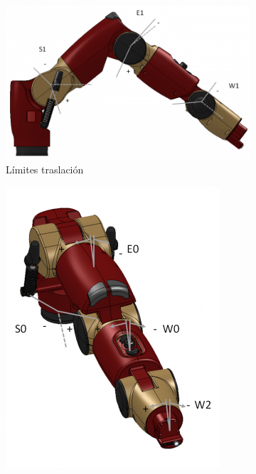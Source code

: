\begin{figure}[tbh]
	\centering
	\begin{subfigure}[b]{0.4\textwidth}
		\includegraphics[trim=0 0 0 10, clip, width=\textwidth]{imagenes/metodos/baxter_range_motion1.png}
		\caption{Límites traslación}
		\label{fig:metodos/limits1}
	\end{subfigure}
	\begin{subfigure}[b]{0.4\textwidth}
		\includegraphics[width=\textwidth]{imagenes/metodos/baxter_range_motion2.png}

\end{subfigure}
\end{figure}
